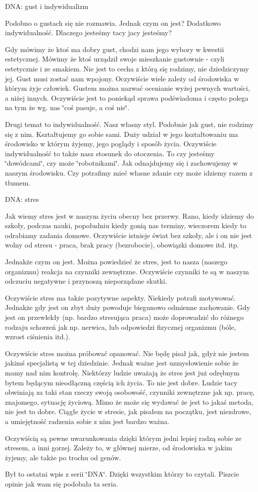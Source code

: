 D\-N\-A\-: gust i indywidualizm

Podobno o gustach się nie rozmawia. Jednak czym on jest? Dodatkowo indywidualność. Dlaczego jesteśmy tacy jacy jesteśmy?

Gdy mówimy że ktoś ma dobry gust, chodzi nam jego wybory w kwestii estetycznej. Mówimy że ktoś urządził swoje mieszkanie gustownie -\/ czyli estetycznie i ze smakiem. Nie jest to cecha z którą się rodzimy, nie dziedziczymy jej. Gust musi zostać nam wpojony. Oczywiście wiele zależy od środowiska w którym żyje człowiek. Gustem można nazwać ocenianie wyżej pewnych wartości, a niżej innych. Oczywiście jest to poniekąd sprawa podświadoma i często polega na tym że wg. nas \char`\"{}coś pasuje, a coś nie\char`\"{}.

Drugi temat to indywidualność. Nasz własny styl. Podobnie jak gust, nie rodzimy się z nim. Kształtujemy go sobie sami. Duży udział w jego kształtowaniu ma środowisko w którym żyjemy, jego poglądy i sposób życia. Oczywiście indywidualność to także nasz stosunek do otoczenia. To czy jesteśmy \char`\"{}dowódcami\char`\"{}, czy może \char`\"{}robotnikami\char`\"{}. Jak odnajdujemy się i zachowujemy w naszym środowisku. Czy potrafimy mieć własne zdanie czy może idziemy razem z tłumem.

D\-N\-A\-: stres

Jak wiemy stres jest w naszym życiu obecny bez przerwy. Rano, kiedy idziemy do szkoły, podczas nauki, popołudniu kiedy gonią nas terminy, wieczorem kiedy to odrabiamy zadania domowe. Oczywiście istnieje świat bez szkoły, ale i on nie jest wolny od stresu -\/ praca, brak pracy (bezrobocie), obowiązki domowe itd. itp.

Jednakże czym on jest. Można powiedzieć że stres, jest to nasza (naszego organizmu) reakcja na czynniki zewnętrzne. Oczywiście czynniki te są w naszym odczuciu negatywne i przynoszą nieporządane skutki.

Oczywiście stres ma także pozytywne aspekty. Niekiedy potrafi motywować. Jednakże gdy jest on zbyt duży powoduje biegunowo odmienne zachowanie. Gdy jest on przewlekły (np. bardzo stresująca praca) może doprowadzić do różnego rodzaju schorzeń jak np. nerwica, lub odpowiedzi fizycznej organizmu (bóle, wzrost ciśnienia itd.).

Oczywiście stres można próbować opanować. Nie będę pisał jak, gdyż nie jestem jakimś specjalistą w tej dziedzinie. Jednak ważne jest uzmysłowienie sobie że mamy nad nim kontrolę. Niektórzy ludzie uważają że stres jest już odrębnym bytem będącym nieodłączną częścią ich życia. To nie jest dobre. Ludzie tacy obwiniają za taki stan rzeczy swoją osobowość, czynniki zewnętrzne jak np. pracę, znajomego, sytuację życiową. Mimo że może się wydawać że jest to jakaś metoda, nie jest to dobre. Ciągłe życie w stresie, jak pisałem na początku, jest niezdrowe, a umiejętność radzenia sobie z nim jest bardzo ważna.

Oczywiścią są pewne uwarunkowania dzięki którym jedni lepiej radzą sobie ze stresem, a inni gorzej. Zależy to, w głównej mierze, od środowiska w jakim żyjemy, ale także po trochu od genów.

Był to ostatni wpis z serii \char`\"{}\-D\-N\-A\char`\"{}. Dzięki wszystkim którzy to czytali. Piszcie opinie jak wam się podobała ta seria. 